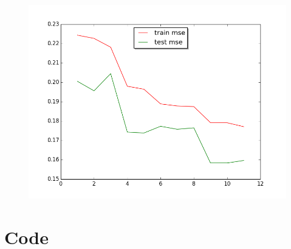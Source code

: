 \documentclass[a4paper,11pt]{article}
\theoremstyle{mytheor}
\begin{document}
\begin{figure}[h]
\centerline{\includegraphics[width=15cm]{p8.png}}
\end{figure}


\clearpage



\clearpage

\section{Code}
\clearpage
\clearpage
\clearpage
\clearpage
\clearpage
\clearpage
\clearpage
\clearpage
\end{document}
